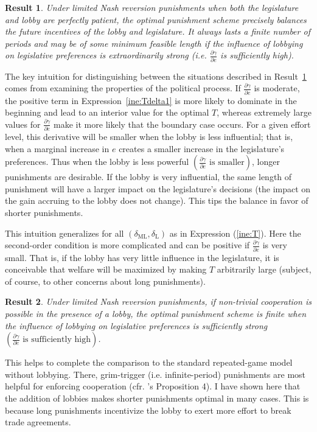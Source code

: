 \documentclass[authoryear, review]{elsarticle}
\newtheorem{result}{Result}
\newcommand{\ga}{\gamma}
\newcommand{\de}{\delta}
\begin{document}
\begin{result}
  Under limited Nash reversion punishments when both the legislature and lobby are perfectly patient, the optimal punishment scheme precisely balances the future incentives of the lobby and legislature. It always lasts a finite number of periods and may be of some minimum feasible length if the influence of lobbying on legislative preferences is extraordinarily strong (i.e. $\frac{\partial \ga}{\partial e}$ is sufficiently high).
  \label{res:opt1}
\end{result}
The key intuition for distinguishing between the situations described in Result~\ref{res:opt1} comes from examining the properties of the political process. If $\frac{\partial \ga}{\partial e}$ is moderate, the positive term in Expression~\ref{ine:Tdelta1} is more likely to dominate in the beginning and lead to an interior value for the optimal $T$, whereas extremely large values for $\frac{\partial \ga}{\partial e}$ make it more likely that the boundary case occurs. For a given effort level, this derivative will be smaller when the lobby is less influential; that is, when a marginal increase in $e$ creates a smaller increase in the legislature's preferences. Thus when the lobby is less powerful $\left(\frac{\partial \ga}{\partial e}\text{ is smaller}\right)$, longer punishments are desirable. If the lobby is very influential, the same length of punishment will have a larger impact on the legislature's decisions (the impact on the gain accruing to the lobby does not change). This tips the balance in favor of shorter punishments.

This intuition generalizes for all $\left(\de_\text{ML},\de_\text{L}\right)$ as in Expression (\ref{ine:T}). Here the second-order condition is more complicated and can be positive if $\frac{\partial \ga}{\partial e}$ is very small. That is, if the lobby has very little influence in the legislature, it is conceivable that welfare will be maximized by making $T$ arbitrarily large (subject, of course, to other concerns about long punishments).

\begin{result}
  Under limited Nash reversion punishments, if non-trivial cooperation is possible in the presence of a lobby, the optimal punishment scheme is finite when the influence of lobbying on legislative preferences is sufficiently strong $\left(\frac{\partial \ga}{\partial e}\text{ is sufficiently high}\right)$.
	\label{res:3}
\end{result}
This helps to complete the comparison to the standard repeated-game model without lobbying. There, grim-trigger (i.e. infinite-period) punishments are most helpful for enforcing cooperation (cfr. \citet{krw}'s Proposition 4). I have shown here that the addition of lobbies makes shorter punishments optimal in many cases. This is because long punishments incentivize the lobby to exert more effort to break trade agreements.
\end{document}
